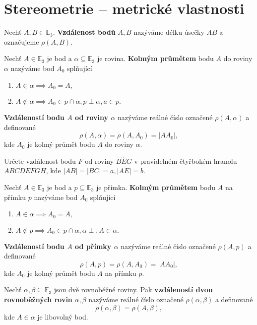 \section{Stereometrie -- metrické vlastnosti}
\begin{definition}
    Nechť $A, B \in \mathbb E_3.$ \textbf{Vzdálenost bodů} $A,B$ nazýváme délku
    úsečky $AB$ a označujeme $\rho(A,B).$
\end{definition}

\begin{definition}
    Nechť $A\in \mathbb E_3$ je bod a $\alpha \subseteq \mathbb E_3$ je rovina.
    \textbf{Kolmým průmětem} bodu $A$ do roviny $\alpha$ nazýváme bod $A_0$
    splňující
    \begin{enumerate}[$i.$]
    \item $A\in \alpha \implies A_0=A,$
   	\item $A\notin \alpha \implies A_0 \in p\cap \alpha, p \perp\alpha, a \in p.$
    \end{enumerate}
    \textbf{Vzdáleností bodu $A$ od roviny $\alpha$} nazýváme reálné číslo označené
    $\rho(A,\alpha) $ a definované
    $$\rho(A,\alpha) = \rho(A, A_0) = |AA_0|,$$
    kde $A_0$ je kolmý průmět bodu $A$ do roviny $\alpha.$
\end{definition}

\begin{priklad}
Určete vzdálenost bodu $F$ od roviny $\overleftrightarrow{BEG}$ v pravidelném
čtyřbokém hranolu $ABCDEFGH$, kde $|AB|=|BC|=a, |AE|=b$.
\end{priklad}

\begin{definition}
    Nechť $A\in \mathbb E_3$ je bod a $p \subseteq \mathbb E_3$ je přímka.
    \textbf{Kolmým průmětem} bodu $A$ na přímku $p$ nazýváme bod $A_0$
    splňující
    \begin{enumerate}[$i.$]
    \item $A\in \alpha \implies A_0=A,$
    \item $A\notin p \implies A_0 \in p\cap \alpha, \alpha \perp, A \in \alpha.$
    \end{enumerate}
    \textbf{Vzdáleností bodu $A$ od přímky $\alpha$} nazýváme reálné číslo označené
    $\rho(A,p) $ a definované
    $$\rho(A,p) = \rho(A, A_0) = |AA_0|,$$
    kde $A_0$ je kolmý průmět bodu $A$ na přímku $p.$
\end{definition}

\begin{definition}
    Nechť $\alpha, \beta \subseteq \mathbb E_3$ jsou dvě rovnoběžné roviny. Pak
    \textbf{vzdáleností dvou rovnoběžných rovin} $\alpha, \beta$ nazýváme reálné
    číslo označené $\rho(\alpha, \beta)$ a definované
    $$\rho(\alpha, \beta)=\rho(A,\beta),$$
    kde $A\in\alpha$ je libovolný bod.
\end{definition}

